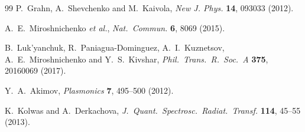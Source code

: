 \documentclass[aps,prb,reprint]{revtex4-2}
\begin{document}
\begin{thebibliography}{99}
P.~Grahn, A.~Shevchenko and M.~Kaivola,
{\it New J. Phys.} {\bf 14}, 093033 (2012).

A.~E.~Miroshnichenko {\it et al.}, %
{\it Nat.~Commun.} {\bf 6}, 8069 (2015).

B.~Luk'yanchuk, R.~Paniagua-Dominguez, A.~I.~Kuznetsov, A.~E.~Miroshnichenko and Y.~S.~Kivshar, 
{\it Phil.~Trans.~R.~Soc.~A} {\bf 375}, 20160069 (2017).


Y.~A.~Akimov,
{\it Plasmonics} {\bf 7}, 495--500 (2012).

K.~Kolwas and A.~Derkachova,
{\it J.~Quant.~Spectrosc.~Radiat.~Transf.} {\bf 114}, 45--55 (2013).

\end{thebibliography}
\end{document}
